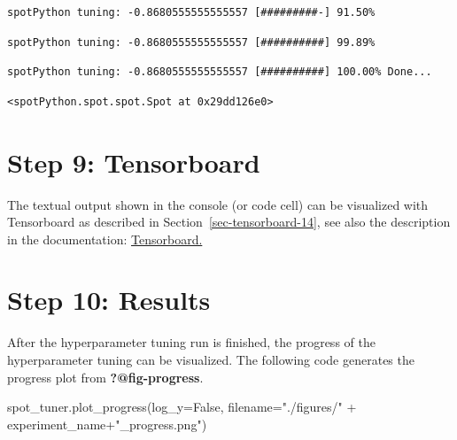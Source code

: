 \documentclass[
  letterpaper,
  DIV=11,
  numbers=noendperiod]{scrreprt}
\newenvironment{Shaded}{\begin{snugshade}}{\end{snugshade}}
\newcommand{\NormalTok}[1]{\textcolor[rgb]{0.00,0.23,0.31}{#1}}
\newcommand{\OperatorTok}[1]{\textcolor[rgb]{0.37,0.37,0.37}{#1}}
\newcommand{\StringTok}[1]{\textcolor[rgb]{0.13,0.47,0.30}{#1}}
\newcommand{\VariableTok}[1]{\textcolor[rgb]{0.07,0.07,0.07}{#1}}
\begin{document}
\begin{verbatim}
spotPython tuning: -0.8680555555555557 [#########-] 91.50% 
\end{verbatim}

\begin{verbatim}
spotPython tuning: -0.8680555555555557 [##########] 99.89% 
\end{verbatim}

\begin{verbatim}
spotPython tuning: -0.8680555555555557 [##########] 100.00% Done...
\end{verbatim}

\begin{verbatim}
<spotPython.spot.spot.Spot at 0x29dd126e0>
\end{verbatim}

\hypertarget{sec-tensorboard-17}{%
\section{Step 9: Tensorboard}\label{sec-tensorboard-17}}

The textual output shown in the console (or code cell) can be visualized
with Tensorboard as described in Section~\ref{sec-tensorboard-14}, see
also the description in the documentation:
\href{https://sequential-parameter-optimization.github.io/spotPython/14_spot_ray_hpt_torch_cifar10.html\#sec-tensorboard-14}{Tensorboard.}

\hypertarget{sec-results-tuning-17}{%
\section{Step 10: Results}\label{sec-results-tuning-17}}

After the hyperparameter tuning run is finished, the progress of the
hyperparameter tuning can be visualized. The following code generates
the progress plot from \textbf{?@fig-progress}.

\begin{Shaded}
\begin{Highlighting}[]
\NormalTok{spot\_tuner.plot\_progress(log\_y}\OperatorTok{=}\VariableTok{False}\NormalTok{,}
\NormalTok{    filename}\OperatorTok{=}\StringTok{"./figures/"} \OperatorTok{+}\NormalTok{ experiment\_name}\OperatorTok{+}\StringTok{"\_progress.png"}\NormalTok{)}
\end{Highlighting}
\end{Shaded}
\end{document}
